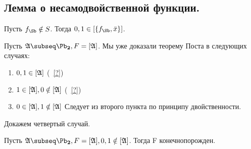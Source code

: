 \documentclass[unicode, 10pt, a4paper, oneside, fleqn]{article}
\begin{document}
\subsection{Лемма о несамодвойственной функции.\\}
\begin{lemma}
 \label{22}
  Пусть $\fS \notin S$. Тогда $0,1 \in \cls{\fS,\bar x}$.
\end{lemma}
Пусть $\ag\subseq\PD, F=[\ag]$. 
Мы уже доказали теорему Поста в следующих случаях: \REF
\begin{enumerate}
  \item $0,1\in [\mathfrak{A}]$ (~\ref{?})
  \item $1\in [\mathfrak{A}], 0\notin [\mathfrak{A}]$ (~\ref{?})
  \item $0\in [\mathfrak{A}], 1 \notin [\mathfrak{A}]$ Следует из второго пункта по принципу двойственности.
\end{enumerate}
Докажем четвертый случай.
\begin{theorem}
Пусть $\ag\subseq\PD,F=[\ag], 0,1\notin[\ag]$. Тогда F конечнопорожден.
\end{theorem}
\end{document}
